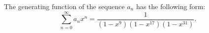 

\setcounter{section}{3}
\setcounter{subsection}{1}
\setcounter{dfn}{0}

\begin{thm}
\label{thm:Dollars}
The generating function of the sequence $a_n$ has the following form:
\[
\sum_{n=0}^\infty a_n x^n = \frac{1}{(1-x^9)(1-x^{17})(1-x^{31})}.
\]
\end{thm}


